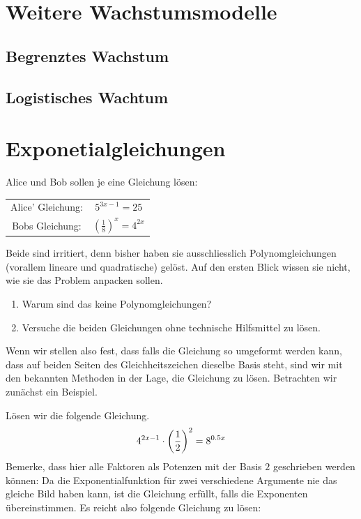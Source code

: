 \documentclass[11pt,oneside]{article}
\begin{document}
\newpage
\section{Weitere Wachstumsmodelle}
\subsection{Begrenztes Wachstum}
\subsection{Logistisches Wachtum}

\newpage
\section{Exponetialgleichungen}
	\begin{aufgabe}
		Alice und Bob sollen je eine Gleichung lösen:
		\begin{table}[H]
			\centering
			\begin{tabular}{c c}
				Alice' Gleichung: & $5^{3x-1}=25$ \\
				Bobs Gleichung: & $\left(\frac{1}{8}\right)^x=4^{2x}$
			\end{tabular}
		\end{table}
		Beide sind irritiert, denn bisher haben sie ausschliesslich Polynomgleichungen (vorallem lineare und quadratische) gelöst. Auf den ersten Blick wissen sie nicht, wie sie das Problem anpacken sollen.
		\begin{enumerate}[label=\alph*)]
			\item Warum sind das keine Polynomgleichungen? \vspace{5pt}\newline{}
			\item Versuche die beiden Gleichungen ohne technische Hilfsmittel zu lösen. \vspace{5pt}\newline{}
		\end{enumerate}
	\end{aufgabe}
	Wenn wir stellen also fest, dass falls die Gleichung so umgeformt werden kann, dass auf beiden Seiten des Gleichheitszeichen dieselbe Basis steht, sind wir mit den bekannten Methoden in der Lage, die Gleichung zu lösen. Betrachten wir zunächst ein Beispiel.\newline
	\begin{beispiel}
		Lösen wir die folgende Gleichung.\[4^{2x-1}\cdot\left(\frac{1}{2}\right)^2=8^{0.5x}\] Bemerke, dass hier alle Faktoren als Potenzen mit der Basis $2$ geschrieben werden können:\vspace{5pt}\newline{}
		Da die Exponentialfunktion für zwei verschiedene Argumente nie das gleiche Bild haben kann, ist die Gleichung erfüllt, falls die Exponenten übereinstimmen. Es reicht also folgende Gleichung zu lösen:\vspace{5pt}\newline{}
	\end{beispiel}
\end{document}
